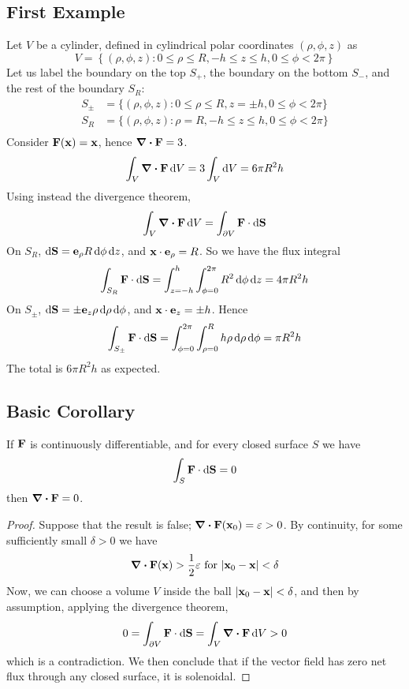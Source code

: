 \documentclass{article}
\begin{document}
\subsection{First Example}
Let $V$ be a cylinder, defined in cylindrical polar coordinates $(\rho, \phi, z)$ as
\[ V = \left\{ (\rho, \phi, z) \colon 0 \leq \rho \leq R, -h \leq z \leq h, 0 \leq \phi < 2 \pi \right\} \]
Let us label the boundary on the top $S_+$, the boundary on the bottom $S_-$, and the rest of the boundary $S_R$:
\begin{align*}
	S_\pm & = \{ (\rho, \phi, z) \colon 0 \leq \rho \leq R, z = \pm h, 0 \leq \phi < 2 \pi \} \\
	S_R   & = \{ (\rho, \phi, z) \colon \rho = R, -h \leq z \leq h, 0 \leq \phi < 2 \pi \}    \\
\end{align*}
Consider $\vb F(\vb x) = \vb x$, hence $\div{\vb F} = 3$.
\[ \int_V \div{\vb F} \dd{V} = 3 \int_V \dd{V} = 6\pi R^2 h \]
Using instead the divergence theorem,
\[ \int_V \div{\vb F} \dd{V} = \int_{\partial V} \vb F \cdot \dd{\vb S} \]
On $S_R$, $\dd{\vb S} = \vb e_\rho R \dd{\phi}\dd{z}$, and $\vb x \cdot \vb e_\rho = R$. So we have the flux integral
\[ \int_{S_R} \vb F \cdot \dd{\vb S} = \int_{z = -h}^h \int_{\phi = 0}^{2 \pi} R^2 \dd{\phi} \dd{z} = 4\pi R^2 h \]
On $S_\pm$, $\dd{\vb S} = \pm \vb e_z \rho \dd{\rho}\dd{\phi}$, and $\vb x \cdot \vb e_z = \pm h$. Hence
\[ \int_{S_\pm} \vb F \cdot \dd{\vb S} = \int_{\phi = 0}^{2 \pi} \int_{\rho = 0}^R h \rho\dd{\rho}\dd{\phi} = \pi R^2 h \]
The total is $6\pi R^2 h$ as expected.

\subsection{Basic Corollary}
\begin{proposition}
	If $\vb F$ is continuously differentiable, and for every closed surface $S$ we have
	\[ \int_S \vb F \cdot \dd{\vb S} = 0 \]
	then $\div{\vb F} = 0$.
\end{proposition}
\begin{proof}
	Suppose that the result is false; $\div{\vb F}(\vb x_0) = \varepsilon > 0$. By continuity, for some sufficiently small $\delta > 0$ we have
	\[ \div{\vb F}(\vb x) > \frac{1}{2} \varepsilon \text{ for } \abs{\vb x_0 - \vb x} < \delta \]
	Now, we can choose a volume $V$ inside the ball $\abs{\vb x_0 - \vb x} < \delta$, and then by assumption, applying the divergence theorem,
	\[ 0 = \int_{\partial V} \vb F \cdot \dd{\vb S} = \int_V \div{\vb F} \dd{V} > 0 \]
	which is a contradiction. We then conclude that if the vector field has zero net flux through any closed surface, it is solenoidal.
\end{proof}
\end{document}
